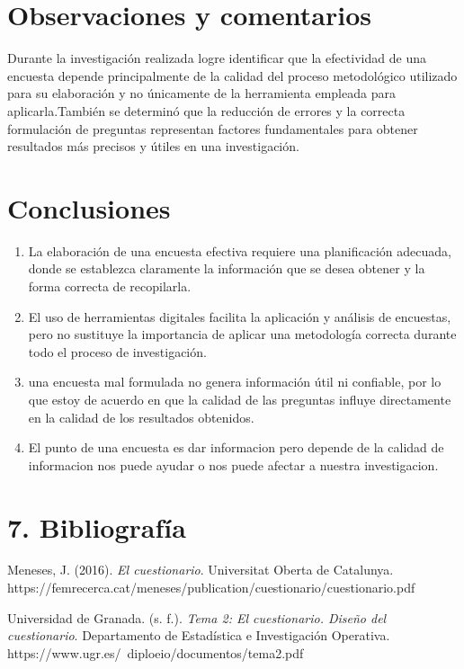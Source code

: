 \documentclass[12pt,letterpaper]{article}
\begin{document}
\section*{Observaciones y comentarios}
Durante la investigación realizada logre identificar que la efectividad de una encuesta depende principalmente de la calidad del proceso metodológico utilizado para su elaboración y no únicamente de la herramienta empleada para aplicarla.También se determinó que la reducción de errores y la correcta formulación de preguntas representan factores fundamentales para obtener resultados más precisos y útiles en una investigación.
\vspace{1em}

\section*{Conclusiones}
\begin{enumerate}
    \item La elaboración de una encuesta efectiva requiere una planificación adecuada, donde se establezca claramente la información que se desea obtener y la forma correcta de recopilarla.
    \item El uso de herramientas digitales facilita la aplicación y análisis de encuestas, pero no sustituye la importancia de aplicar una metodología correcta durante todo el proceso de investigación.
    \item una encuesta mal formulada no genera información útil ni confiable, por lo que estoy de acuerdo en que la calidad de las preguntas influye directamente en la calidad de los resultados obtenidos.
    \item El punto de una encuesta es dar informacion pero depende de la calidad de informacion nos puede ayudar o nos puede afectar a nuestra investigacion.
\end{enumerate}
\vspace{1em}
\section*{7. Bibliografía}

\hangindent=1.27cm

Meneses, J. (2016). 
\textit{El cuestionario}. 
Universitat Oberta de Catalunya. 
https://femrecerca.cat/meneses/publication/cuestionario/cuestionario.pdf

\hangindent=1.27cm

Universidad de Granada. (s. f.). 
\textit{Tema 2: El cuestionario. Diseño del cuestionario}. 
Departamento de Estadística e Investigación Operativa. 
https://www.ugr.es/~diploeio/documentos/tema2.pdf
\end{document}
